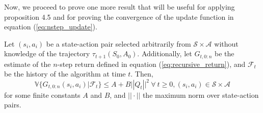 Now, we proceed to prove one more result that will be useful for applying proposition 4.5 and for proving the convergence of the update function in equation (\ref{eq:nstep_update}).

\begin{lemma}
\label{lem:bounded_variance}
Let $(s_i, a_i)$ be a state-action pair selected arbitrarily from $\mathcal{S} \times \mathcal{A}$ without knowledge of the trajectory $\tau_{t+1}(S_0, A_0)$. 
Additionally, let $G_{t, 0:n}$ be the estimate of the $n$-step return defined in equation (\ref{eq:recursive_return}), and $\mathcal{F}_t$ be the history of the algorithm at time $t$. 
Then, 
\begin{equation*}
\mathbb{V} \{ G_{t, 0:n}(s_i, a_i) | \mathcal{F}_t \} \leq A + B || Q_t ||^2 \ \forall \ t \geq 0, 
    (s_i, a_i) \in \mathcal{S} \times \mathcal{A}
\end{equation*}
for some finite constants $A$ and $B$, and $|| \cdot ||$ the maximum norm over state-action pairs.
\end{lemma}

